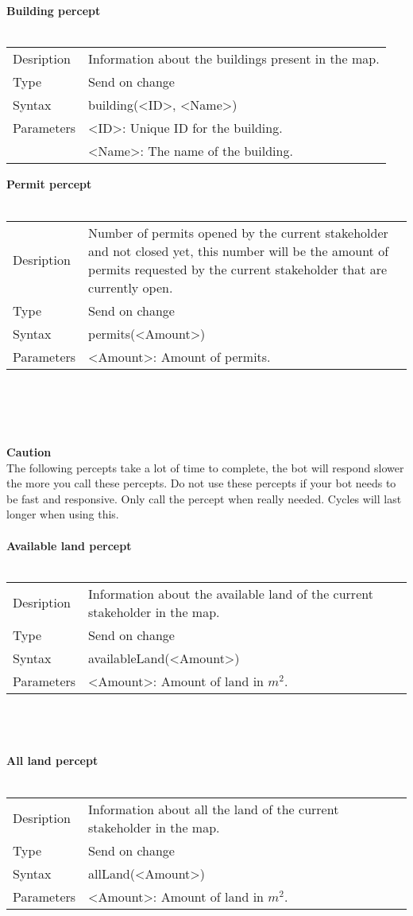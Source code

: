 \documentclass[english,11pt]{report}
\begin{document}
\\
\\
\textbf{Building percept}\\
\\
\begin{tabularx}{\textwidth}{lX}
 Desription & Information about the buildings present in the map. \\
 Type & Send on change \\
 Syntax & building(<ID>, <Name>) \\
 Parameters &   <ID>: Unique ID for the building.\\
            &   <Name>: The name of the building.
\end{tabularx}
\newpage
\textbf{Permit percept}\\
\\
\begin{tabularx}{\textwidth}{lX}
 Desription & Number of permits opened by the current stakeholder and not closed yet, this number will be the amount of permits requested by the current stakeholder that are currently open. \\
 Type & Send on change \\
 Syntax & permits(<Amount>) \\
 Parameters &   <Amount>: Amount of permits.
\end{tabularx}\\
\\
\\
\\
\textbf{Caution}\\
The following percepts take a lot of time to complete, the bot will respond slower the more you call these percepts. Do not use these percepts if your bot needs to be fast and responsive. Only call the percept when really needed. Cycles will last longer when using this.
\\
\\
\textbf{Available land percept}\\
\\
\begin{tabularx}{\textwidth}{lX}
 Desription & Information about the available land of the current stakeholder in the map. \\
 Type & Send on change \\
 Syntax & availableLand(<Amount>) \\
 Parameters &   <Amount>: Amount of land in $m^2$.
\end{tabularx}\\
\\
\\
\textbf{All land percept}\\
\\
\begin{tabularx}{\textwidth}{lX}
 Desription & Information about all the land of the current stakeholder in the map. \\
 Type & Send on change \\
 Syntax & allLand(<Amount>) \\
 Parameters &   <Amount>: Amount of land in $m^2$.
\end{tabularx}\\
\\
\\
\end{document}
